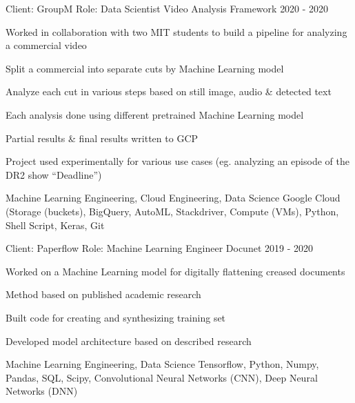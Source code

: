 \begin{cventries}
\cventry
{Client: GroupM \newline Role: Data Scientist} %
{Video Analysis Framework} %
{}%
{2020 - 2020} %
{ %
\begin{cvitems}
    \item {Worked in collaboration with two MIT students to build a pipeline for analyzing a commercial video}
    \item {Split a commercial into separate cuts by Machine Learning model}
    \item {Analyze each cut in various steps based on still image, audio \& detected text}
    \item {Each analysis done using different pretrained Machine Learning model}
    \item {Partial results \& final results written to GCP}
    \item {Project used experimentally for various use cases (eg. analyzing an episode of the DR2 show “Deadline”)}
\end{cvitems}
\cventrykeywords
{Machine Learning Engineering, Cloud Engineering, Data Science}
{Google Cloud (Storage (buckets), BigQuery, AutoML, Stackdriver, Compute (VMs), Python, Shell Script, Keras, Git}
}

\cventry
{Client: Paperflow \newline Role: Machine Learning Engineer} %
{Docunet} %
{}%
{2019 - 2020} %
{ %
\begin{cvitems}
    \item {Worked on a Machine Learning model for digitally flattening creased documents}
    \item {Method based on published academic research}
    \item {Built code for creating and synthesizing training set}
    \item {Developed model architecture based on described research}
\end{cvitems}
\cventrykeywords
{Machine Learning Engineering, Data Science}
{Tensorflow, Python, Numpy, Pandas, SQL, Scipy, Convolutional Neural Networks (CNN), Deep Neural Networks (DNN)}
}


\end{cventries}
